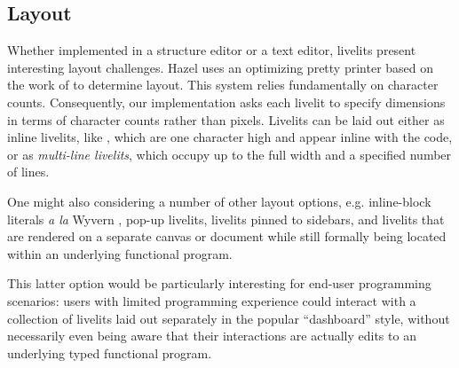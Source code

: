 \subsection{Layout}\label{sec:layout}
Whether implemented in a structure editor or a text editor, livelits present 
interesting layout challenges. 
Hazel uses an optimizing pretty printer based on the work of \citet{DBLP:journals/pacmpl/Bernardy17} to determine layout. This system relies 
fundamentally on character counts. Consequently, our implementation asks each 
livelit to specify dimensions in terms of character counts rather than pixels.
Livelits can be laid out either as inline livelits, like ,
which are one character high and appear inline with the code,
or as \emph{multi-line livelits}, which occupy up to the full width 
and a specified number of lines. %


One might also considering a number of other layout 
options, e.g. inline-block literals \emph{a la} Wyvern \cite{TSLs}, pop-up livelits, livelits pinned to sidebars, and livelits that are rendered  
on a separate canvas or document while still formally being located within an underlying functional program. 

This latter option 
would be particularly interesting for end-user programming scenarios: users with limited
programming experience 
could interact with a collection of livelits laid out separately in the popular ``dashboard'' style, 
without necessarily
even being aware that their interactions are actually edits to an underlying typed
functional program. 


